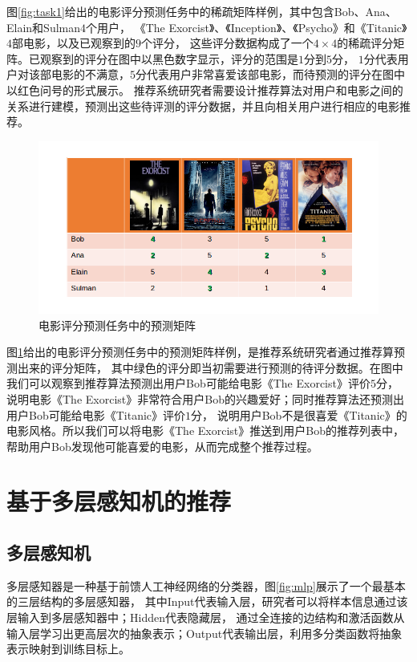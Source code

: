 图\ref{fig:task1}给出的电影评分预测任务中的稀疏矩阵样例，其中包含Bob、Ana、Elain和Sulman$4$个用户，
《The Exorcist》、《Inception》、《Psycho》和《Titanic》$4$部电影，以及已观察到的$9$个评分，
这些评分数据构成了一个$4 \times 4$的稀疏评分矩阵。已观察到的评分在图中以黑色数字显示，评分的范围是$1$分到$5$分，
$1$分代表用户对该部电影的不满意，$5$分代表用户非常喜爱该部电影，而待预测的评分在图中以红色问号的形式展示。
推荐系统研究者需要设计推荐算法对用户和电影之间的关系进行建模，预测出这些待评测的评分数据，并且向相关用户进行相应的电影推荐。

\begin{figure}[htbp]
\centering
\includegraphics[scale=0.6]{images/task2.png}
\caption{电影评分预测任务中的预测矩阵}
\label{fig:task2}
\end{figure}

图\ref{fig:task2}给出的电影评分预测任务中的预测矩阵样例，是推荐系统研究者通过推荐算预测出来的评分矩阵，
其中绿色的评分即当初需要进行预测的待评分数据。在图中我们可以观察到推荐算法预测出用户Bob可能给电影《The Exorcist》评价$5$分，
说明电影《The Exorcist》非常符合用户Bob的兴趣爱好；同时推荐算法还预测出用户Bob可能给电影《Titanic》评价$1$分，
说明用户Bob不是很喜爱《Titanic》的电影风格。所以我们可以将电影《The Exorcist》推送到用户Bob的推荐列表中，
帮助用户Bob发现他可能喜爱的电影，从而完成整个推荐过程。

\section{基于多层感知机的推荐}
\subsection{多层感知机}
多层感知器是一种基于前馈人工神经网络的分类器，图\ref{fig:mlp}展示了一个最基本的三层结构的多层感知器，
其中Input代表输入层，研究者可以将样本信息通过该层输入到多层感知器中；Hidden代表隐藏层，
通过全连接的边结构和激活函数从输入层学习出更高层次的抽象表示；Output代表输出层，利用多分类函数将抽象表示映射到训练目标上。

